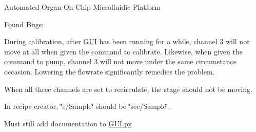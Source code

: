Automated Organ-\/\+On-\/\+Chip Microfluidic Platform

Found Bugs\+:
\begin{DoxyItemize}
\item During calibration, after \mbox{\hyperlink{namespace_g_u_i}{G\+UI}} has been running for a while, channel 3 will not move at all when given the command to calibrate. Likewise, when given the command to pump, channel 3 will not move under the same circumstance occasion. Lowering the flowrate significantly remedies the problem.
\end{DoxyItemize}

When all three channels are set to recirculate, the stage should not be moving.

In recipe creator, \char`\"{}s/\+Sample\char`\"{} should be \char`\"{}sec/\+Sample\char`\"{}.


\begin{DoxyItemize}
\item Must still add documentation to \mbox{\hyperlink{_g_u_i_8py}{G\+U\+I.\+py}} 
\end{DoxyItemize}